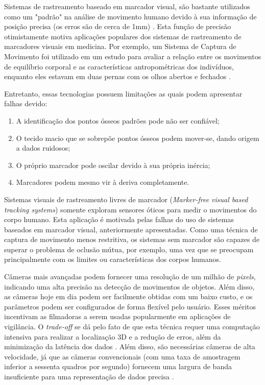 Sistemas de rastreamento baseado em marcador visual, são bastante utilizados como um "padrão" na análise de movimento humano devido à sua informação de posição precisa (os erros são de cerca de 1mm) \cite{zhang2002visual}. Esta função de precisão otimistamente motiva aplicações populares dos sistemas de rastreamento de marcadores visuais em medicina. Por exemplo, um Sistema de Captura de Movimento foi utilizado em um estudo para avaliar a relação entre os movimentos de equilíbrio corporal e as características antropométricas dos indivíduos, enquanto eles estavam em duas pernas com os olhos abertos e fechados \cite{kejonen2003}.

Entretanto, essas tecnologias possuem limitações as quais podem apresentar falhas devido:

\begin{enumerate}
    \item A identificação dos pontos ósseos padrões pode não ser confiável; 
    \item O tecido macio que se sobrepõe pontos ósseos podem mover-se, dando origem a dados ruidosos; 
    \item O próprio marcador pode oscilar devido à sua própria inércia; 
    \item Marcadores podem mesmo vir à deriva completamente.
\end{enumerate}

Sistemas visuais de rastreamento livres de marcador (\textit{Marker-free visual based tracking systems}) somente exploram sensores óticos para medir o movimentos do corpo humano. Esta aplicação é motivada pelas falhas do uso de sistemas baseados em marcador visual, anteriormente apresentadas. Como uma técnica de captura de movimento menos restritiva, os sistemas sem marcador são capazes de superar o problema de oclusão mútua, por exemplo, uma vez que se preocupam principalmente com os limites ou características dos corpos humanos\cite{zhou2008human}.

Câmeras mais avançadas podem fornecer uma resolução de um milhão de \textit{pixels}, indicando uma alta precisão na detecção de movimentos de objetos. Além disso, as câmeras hoje em dia podem ser facilmente obtidas com um baixo custo, e os parâmetros podem ser configurados de forma flexível pelo usuário. Esses méritos incentivam as filmadoras a serem usadas popularmente em aplicações de vigilância. O \textit{trade-off} se dá pelo fato de que esta técnica requer uma computação intensiva para realizar a localização 3D e a redução de erros, além da minimização da latência dos dados \cite{bryson1993}. Além disso, são necessárias câmeras de alta velocidade, já que as câmeras convencionais (com uma taxa de amostragem inferior a sessenta quadros por segundo) fornecem uma largura de banda insuficiente para uma representação de dados precisa \cite{bhatnagar1993position}.


